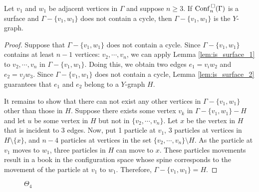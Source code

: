 \begin{lem}
\label{lem:is_surface_Y}
Let \(v_1\) and \(w_1\) be adjacent vertices in \(\Gamma\) and suppose \(n \ge 3\).
If \(\mathrm{Conf}^{\,\square}_n(\Gamma)\) is a surface and \(\Gamma - \{v_1, w_1\}\) does not contain a cycle, then \(\Gamma - \{v_1, w_1\}\) is the \(Y\)-graph.
\end{lem}
\begin{proof}
Suppose that \(\Gamma - \{v_1, w_1\}\) does not contain a cycle.
Since \(\Gamma - \{v_1, w_1\}\) contains at least \(n - 1\) vertices: \(v_2, \cdots, v_n\), 
we can apply Lemma \ref{lem:is_surface_1} to \(v_2, \cdots, v_n\) in \(\Gamma - \{v_1, w_1\}\).
Doing this, we obtain two edges \(e_1 = v_i w_2\) and \(e_2 = v_j w_3\).
Since \(\Gamma - \{v_1, w_1\}\) does not contain a cycle, Lemma \ref{lem:is_surface_2} guarantees that
\(e_1\) and \(e_2\) belong to a \(Y\)-graph \(H\).

It remains to show that there can not exist any other vertices in \(\Gamma - \{v_1, w_1\}\) other than those in \(H\).
Suppose there exists some vertex \(v_k\) in \(\Gamma - \{v_1, w_1\} - H\) and let \(u\) be some vertex in \(H\) but not in \(\{v_2, \cdots, v_n\}\).
Let \(x\) be the vertex in \(H\) that is incident to \(3\) edges.
Now, put 1 particle at \(v_1\), \(3\) particles at vertices in \(H \setminus \{x\}\),
and \(n-4\) particles at vertices in the set \(\{v_2, \cdots, v_n\}\setminus H\).
As the particle at \(v_1\) moves to \(w_1\),
three particles in \(H\) can move to \(x\).
These particles movements result in a book in the configuration space whose spine
corresponds to the movement of the particle at \(v_1\) to \(w_1\).
Therefore, \(\Gamma - \{v_1, w_1\} = H\).
\end{proof}


\begin{figure}[h!]
    \centering
{}
\caption{\(\Theta_4\)}
\label{fig:Theta_4}
\end{figure}

